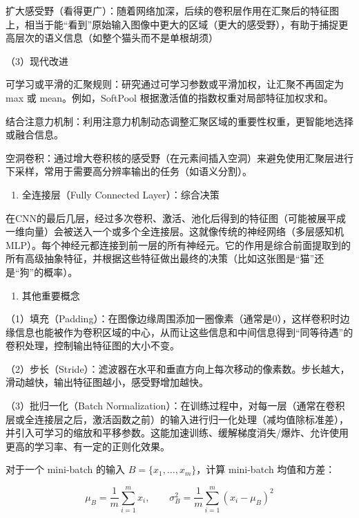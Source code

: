 扩大感受野（看得更广）：随着网络加深，后续的卷积层作用在汇聚后的特征图上，相当于能``看到''原始输入图像中更大的区域（更大的感受野），有助于捕捉更高层次的语义信息（如整个猫头而不是单根胡须）

（3）现代改进

可学习或平滑的汇聚规则：研究通过可学习参数或平滑加权，让汇聚不再固定为 max 或 mean。例如，SoftPool 根据激活值的指数权重对局部特征加权求和。

结合注意力机制：利用注意力机制动态调整汇聚区域的重要性权重，更智能地选择或融合信息。

空洞卷积：通过增大卷积核的感受野（在元素间插入空洞）来避免使用汇聚层进行下采样，常用于需要高分辨率输出的任务（如语义分割）。

\begin{enumerate}
\def\labelenumi{\arabic{enumi}.}
\setcounter{enumi}{3}
\tightlist
\item
  全连接层（Fully Connected Layer）：综合决策
\end{enumerate}

在CNN的最后几层，经过多次卷积、激活、池化后得到的特征图（可能被展平成一维向量）会被送入一个或多个全连接层。这就像传统的神经网络（多层感知机MLP）。每个神经元都连接到前一层的所有神经元。它的作用是综合前面提取到的所有高级抽象特征，并根据这些特征做出最终的决策（比如这张图是``猫''还是``狗''的概率）。

\begin{enumerate}
\def\labelenumi{\arabic{enumi}.}
\setcounter{enumi}{4}
\tightlist
\item
  其他重要概念
\end{enumerate}

（1）填充（Padding）：在图像边缘周围添加一圈像素（通常是0），这样卷积时边缘信息也能被作为卷积区域的中心，从而让这些信息和中间信息得到``同等待遇''的卷积处理，控制输出特征图的大小不变。

（2）步长（Stride）：滤波器在水平和垂直方向上每次移动的像素数。步长越大，滑动越快，输出特征图越小，感受野增加越快。

（3）批归一化（Batch Normalization）：在训练过程中，对每一层（通常在卷积层或全连接层之后，激活函数之前）的输入进行归一化处理（减均值除标准差），并引入可学习的缩放和平移参数。这能加速训练、缓解梯度消失/爆炸、允许使用更高的学习率、有一定的正则化效果。

对于一个 mini-batch 的输入 \(B=\{x_1,\ldots,x_m\}\)，计算 mini-batch 均值和方差：

\[
\mu_B=\frac{1}{m}\sum_{i=1}^{m}x_i,\qquad
\sigma_B^2=\frac{1}{m}\sum_{i=1}^{m}(x_i-\mu_B)^2
\]

